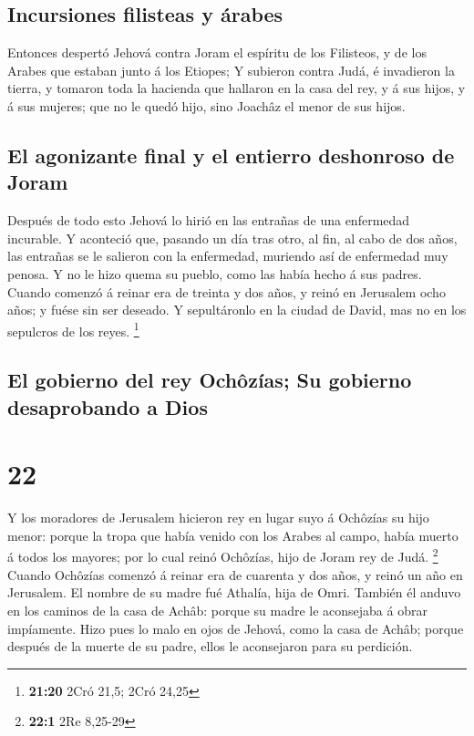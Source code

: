 \hypertarget{incursiones-filisteas-y-uxe1rabes}{%
\subsection{Incursiones filisteas y
árabes}\label{incursiones-filisteas-y-uxe1rabes}}

 Entonces despertó Jehová contra Joram el espíritu de los
Filisteos, y de los Arabes que estaban junto á los Etiopes;
 Y subieron contra Judá, é invadieron la tierra, y
tomaron toda la hacienda que hallaron en la casa del rey, y á sus hijos,
y á sus mujeres; que no le quedó hijo, sino Joachâz el menor de sus
hijos.

\hypertarget{el-agonizante-final-y-el-entierro-deshonroso-de-joram}{%
\subsection{El agonizante final y el entierro deshonroso de
Joram}\label{el-agonizante-final-y-el-entierro-deshonroso-de-joram}}

 Después de todo esto Jehová lo hirió en las entrañas de
una enfermedad incurable.  Y aconteció que, pasando un
día tras otro, al fin, al cabo de dos años, las entrañas se le salieron
con la enfermedad, muriendo así de enfermedad muy penosa. Y no le hizo
quema su pueblo, como las había hecho á sus padres. 
Cuando comenzó á reinar era de treinta y dos años, y reinó en Jerusalem
ocho años; y fuése sin ser deseado. Y sepultáronlo en la ciudad de
David, mas no en los sepulcros de los reyes. \footnote{\textbf{21:20}
  2Cró 21,5; 2Cró 24,25}

\hypertarget{el-gobierno-del-rey-ochuxf4zuxedas-su-gobierno-desaprobando-a-dios}{%
\subsection{El gobierno del rey Ochôzías; Su gobierno desaprobando a
Dios}\label{el-gobierno-del-rey-ochuxf4zuxedas-su-gobierno-desaprobando-a-dios}}

\hypertarget{section-21}{%
\section{22}\label{section-21}}

 Y los moradores de Jerusalem hicieron rey en lugar suyo á
Ochôzías su hijo menor: porque la tropa que había venido con los Arabes
al campo, había muerto á todos los mayores; por lo cual reinó Ochôzías,
hijo de Joram rey de Judá. \footnote{\textbf{22:1} 2Re 8,25-29}
 Cuando Ochôzías comenzó á reinar era de cuarenta y dos
años, y reinó un año en Jerusalem. El nombre de su madre fué Athalía,
hija de Omri.  También él anduvo en los caminos de la casa
de Achâb: porque su madre le aconsejaba á obrar impíamente.
 Hizo pues lo malo en ojos de Jehová, como la casa de
Achâb; porque después de la muerte de su padre, ellos le aconsejaron
para su perdición.

